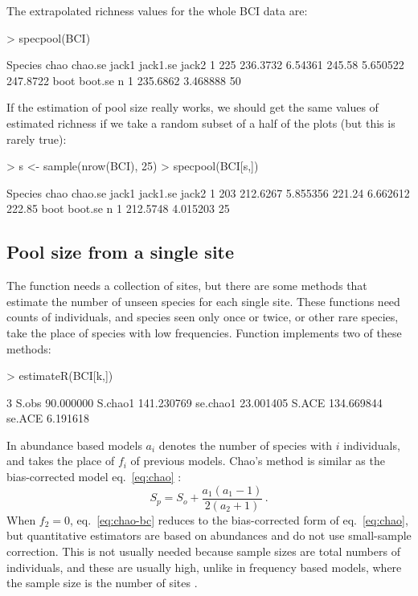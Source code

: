 \documentclass[a4paper,10pt,twocolumn]{article}
\begin{document}
The extrapolated richness values for the whole BCI data are:
\begin{Schunk}
\begin{Sinput}
> specpool(BCI)
\end{Sinput}
\begin{Soutput}
  Species     chao chao.se  jack1 jack1.se    jack2
1     225 236.3732 6.54361 245.58 5.650522 247.8722
      boot  boot.se  n
1 235.6862 3.468888 50
\end{Soutput}
\end{Schunk}
If the estimation of pool size really works, we should get the same
values of estimated richness if we take a random subset of a half of
the plots (but this is rarely true):
\begin{Schunk}
\begin{Sinput}
> s <- sample(nrow(BCI), 25)
> specpool(BCI[s,])
\end{Sinput}
\begin{Soutput}
  Species     chao  chao.se  jack1 jack1.se  jack2
1     203 212.6267 5.855356 221.24 6.662612 222.85
      boot  boot.se  n
1 212.5748 4.015203 25
\end{Soutput}
\end{Schunk}

\subsection{Pool size from a single site}

The  function needs a collection of sites, but there
are some methods that estimate the number of unseen species for each
single site.  These functions need counts of individuals, and species
seen only once or twice, or other rare species, take the place of
species with low frequencies.  Function  implements
two of these methods:
\begin{Schunk}
\begin{Sinput}
> estimateR(BCI[k,])
\end{Sinput}
\begin{Soutput}
                  3
S.obs     90.000000
S.chao1  141.230769
se.chao1  23.001405
S.ACE    134.669844
se.ACE     6.191618
\end{Soutput}
\end{Schunk}
In abundance based models $a_i$ denotes the number of species with $i$
individuals, and takes the place of $f_i$ of previous models.
Chao's method is similar as the bias-corrected model
eq.~\ref{eq:chao} \citep{Chao87, ChiuEtal14}:
\begin{equation}
  \label{eq:chao-bc}
  S_p = S_o + \frac{a_1 (a_1 - 1)}{2 (a_2 + 1)}\,.
\end{equation}
When $f_2=0$, eq.~\ref{eq:chao-bc} reduces to the bias-corrected form
of eq.~\ref{eq:chao}, but quantitative estimators are based on
abundances and do not use small-sample correction. This is not usually
needed because sample sizes are total numbers of individuals, and
these are usually high, unlike in frequency based models, where the
sample size is the number of sites \citep{ChiuEtal14}. 
\end{document}
